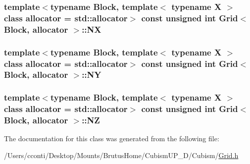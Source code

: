 \subsubsection[{N\+X}]{\setlength{\rightskip}{0pt plus 5cm}template$<$typename Block, template$<$ typename X $>$ class allocator = std\+::allocator$>$ const unsigned int {\bf Grid}$<$ Block, allocator $>$\+::N\+X\hspace{0.3cm}{\ttfamily [protected]}}\label{class_grid_a5253120e941ec878f57dd17d5f54cadd}
\hypertarget{class_grid_a8956891d20426acabca4252ec7e299bc}{}
\subsubsection[{N\+Y}]{\setlength{\rightskip}{0pt plus 5cm}template$<$typename Block, template$<$ typename X $>$ class allocator = std\+::allocator$>$ const unsigned int {\bf Grid}$<$ Block, allocator $>$\+::N\+Y\hspace{0.3cm}{\ttfamily [protected]}}\label{class_grid_a8956891d20426acabca4252ec7e299bc}
\hypertarget{class_grid_ad6632ff47c714e008ba88a89b4c1684b}{}
\subsubsection[{N\+Z}]{\setlength{\rightskip}{0pt plus 5cm}template$<$typename Block, template$<$ typename X $>$ class allocator = std\+::allocator$>$ const unsigned int {\bf Grid}$<$ Block, allocator $>$\+::N\+Z\hspace{0.3cm}{\ttfamily [protected]}}\label{class_grid_ad6632ff47c714e008ba88a89b4c1684b}


The documentation for this class was generated from the following file\+:\begin{DoxyCompactItemize}
\item 
/\+Users/cconti/\+Desktop/\+Mounts/\+Brutus\+Home/\+Cubism\+U\+P\+\_\+D/\+Cubism/\hyperlink{_grid_8h}{Grid.\+h}\end{DoxyCompactItemize}
